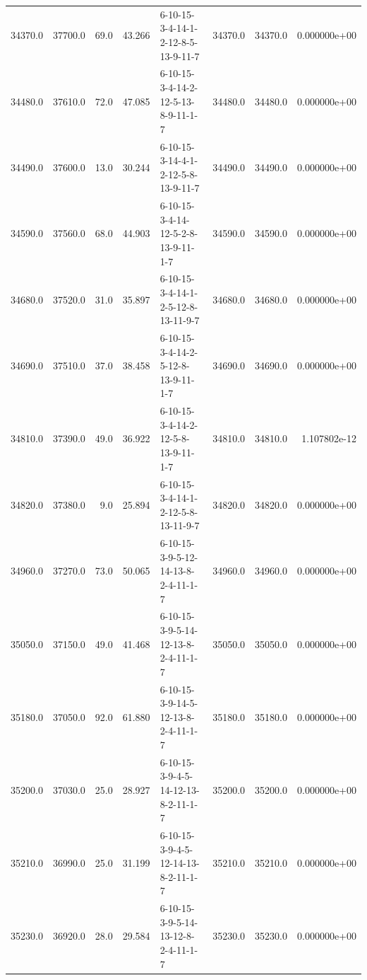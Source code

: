 \begin{tabular}{rrrrlrrr}
 34370.0 &  37700.0 &           69.0 &             43.266 &  6-10-15-3-4-14-1-2-12-8-5-13-9-11-7 &       34370.0 &         34370.0 &  0.000000e+00 \\
 34480.0 &  37610.0 &           72.0 &             47.085 &  6-10-15-3-4-14-2-12-5-13-8-9-11-1-7 &       34480.0 &         34480.0 &  0.000000e+00 \\
 34490.0 &  37600.0 &           13.0 &             30.244 &  6-10-15-3-14-4-1-2-12-5-8-13-9-11-7 &       34490.0 &         34490.0 &  0.000000e+00 \\
 34590.0 &  37560.0 &           68.0 &             44.903 &  6-10-15-3-4-14-12-5-2-8-13-9-11-1-7 &       34590.0 &         34590.0 &  0.000000e+00 \\
 34680.0 &  37520.0 &           31.0 &             35.897 &  6-10-15-3-4-14-1-2-5-12-8-13-11-9-7 &       34680.0 &         34680.0 &  0.000000e+00 \\
 34690.0 &  37510.0 &           37.0 &             38.458 &  6-10-15-3-4-14-2-5-12-8-13-9-11-1-7 &       34690.0 &         34690.0 &  0.000000e+00 \\
 34810.0 &  37390.0 &           49.0 &             36.922 &  6-10-15-3-4-14-2-12-5-8-13-9-11-1-7 &       34810.0 &         34810.0 &  1.107802e-12 \\
 34820.0 &  37380.0 &            9.0 &             25.894 &  6-10-15-3-4-14-1-2-12-5-8-13-11-9-7 &       34820.0 &         34820.0 &  0.000000e+00 \\
 34960.0 &  37270.0 &           73.0 &             50.065 &  6-10-15-3-9-5-12-14-13-8-2-4-11-1-7 &       34960.0 &         34960.0 &  0.000000e+00 \\
 35050.0 &  37150.0 &           49.0 &             41.468 &  6-10-15-3-9-5-14-12-13-8-2-4-11-1-7 &       35050.0 &         35050.0 &  0.000000e+00 \\
 35180.0 &  37050.0 &           92.0 &             61.880 &  6-10-15-3-9-14-5-12-13-8-2-4-11-1-7 &       35180.0 &         35180.0 &  0.000000e+00 \\
 35200.0 &  37030.0 &           25.0 &             28.927 &  6-10-15-3-9-4-5-14-12-13-8-2-11-1-7 &       35200.0 &         35200.0 &  0.000000e+00 \\
 35210.0 &  36990.0 &           25.0 &             31.199 &  6-10-15-3-9-4-5-12-14-13-8-2-11-1-7 &       35210.0 &         35210.0 &  0.000000e+00 \\
 35230.0 &  36920.0 &           28.0 &             29.584 &  6-10-15-3-9-5-14-13-12-8-2-4-11-1-7 &       35230.0 &         35230.0 &  0.000000e+00 \\

\end{tabular}
